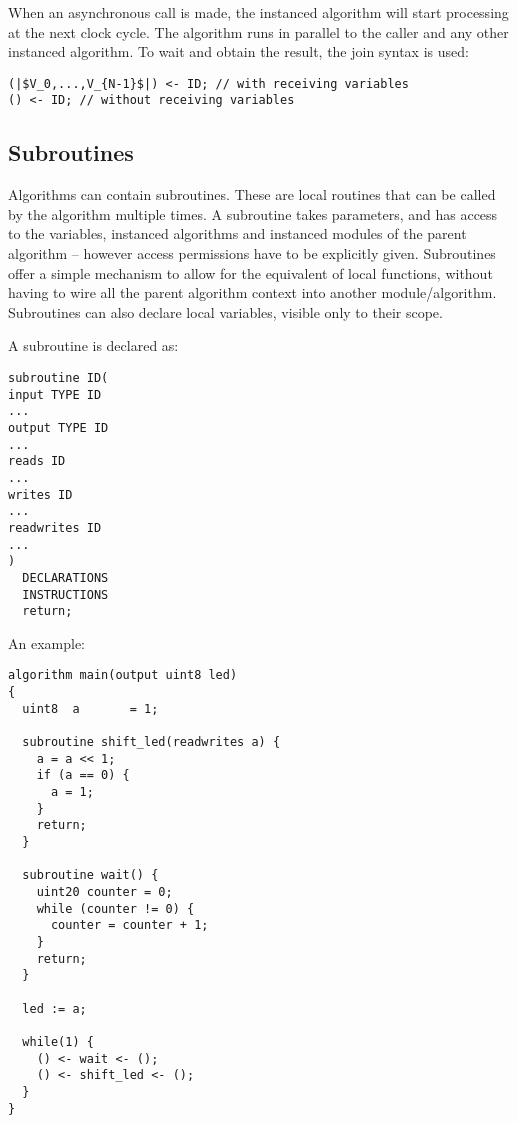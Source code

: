\documentclass[a4]{article}
\begin{document}
When an asynchronous call is made, the instanced algorithm will start processing at the next clock cycle. The algorithm runs in parallel to the caller and any other instanced algorithm. To wait and obtain the result, the join syntax is used:

\begin{verbatim}
(|$V_0,...,V_{N-1}$|) <- ID; // with receiving variables
() <- ID; // without receiving variables
\end{verbatim}



\vspace*{5mm}
\noindent
{}


\subsection{Subroutines}

Algorithms can contain subroutines. These are local routines that can be called by the algorithm multiple times. A subroutine takes parameters, and has access to the variables, instanced algorithms and instanced modules of the parent algorithm -- however access permissions have to be explicitly given. 
%
Subroutines offer a simple mechanism to allow for the equivalent of local functions, without having to wire all the parent algorithm context into another module/algorithm. Subroutines can also declare local variables, visible only to their scope.

A subroutine is declared as:

\begin{verbatim}
subroutine ID(
input TYPE ID
...
output TYPE ID
...
reads ID
...
writes ID
...
readwrites ID
...
)
  DECLARATIONS
  INSTRUCTIONS
  return;
\end{verbatim}

An example:

\begin{verbatim}
algorithm main(output uint8 led)
{
  uint8  a       = 1;

  subroutine shift_led(readwrites a) {
    a = a << 1;
    if (a == 0) {
      a = 1;
    }
    return;
  }

  subroutine wait() {
    uint20 counter = 0;
    while (counter != 0) {
      counter = counter + 1;
    }
    return;
  }
    
  led := a;
  
  while(1) {
    () <- wait <- ();
    () <- shift_led <- ();
  }
}
\end{verbatim}
\end{document}
